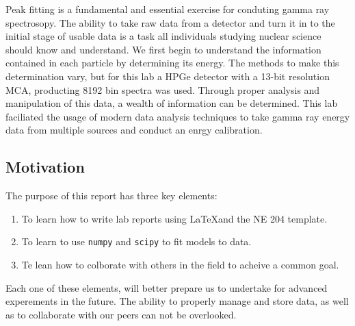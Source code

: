 Peak fitting is a fundamental and essential exercise for conduting gamma ray spectrosopy.
The ability to take raw data from a detector and turn it in to the initial stage of usable
data is a task all individuals studying nuclear science should know and understand. We first begin to
understand the information contained in each particle by determining its energy.  The methods to make this
determination vary, but for this lab a HPGe detector with a 13-bit resolution MCA, producting 8192 bin spectra was used.
Through proper analysis and manipulation of this data, a wealth of information can be determined.
This lab faciliated the usage of modern data analysis techniques to take gamma ray energy data from
multiple sources and conduct an enrgy calibration.

\subsection*{Motivation}
\label{sec:motivation}

The purpose of this report has three key elements:

\begin{enumerate}
  \item To learn how to write lab reports using \LaTeX and the NE 204 template.
  \item To learn to use {\tt numpy} and {\tt scipy} to fit models to data.
  \item Te lean how to colborate with others in the field to acheive a common goal.
\end{enumerate}

Each one of these elements, will better prepare us to undertake for advanced experements in the future.
The ability to properly manage and store data, as well as to collaborate with our peers can not be overlooked.
